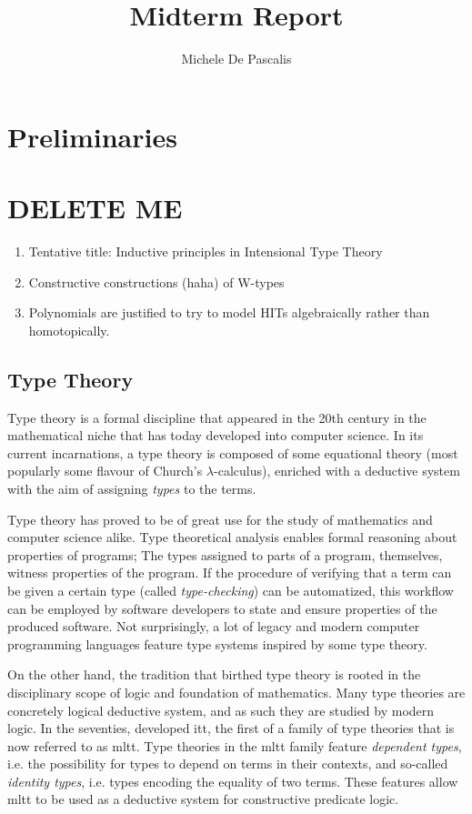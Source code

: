 \documentclass[a4paper]{article}
\author{Michele De Pascalis}
\title{Midterm Report}
\begin{document}
\maketitle

\section{Preliminaries}

\section{DELETE ME}

\begin{enumerate}

	\item Tentative title: Inductive principles in Intensional Type Theory
	\item Constructive constructions (haha) of W-types
	\item Polynomials are justified to try to model HITs algebraically rather than homotopically.
\end{enumerate}

\subsection{Type Theory}

Type theory is a formal discipline that appeared in the 20th century in the mathematical niche that has today developed into computer science. In its current incarnations, a type theory is composed of some equational theory (most popularly some flavour of Church's \(\lambda\)-calculus), enriched with a deductive system with the aim of assigning \textit{types} to the terms.

Type theory has proved to be of great use for the study of mathematics and computer science alike. Type theoretical analysis enables formal reasoning about properties of programs; The types assigned to parts of a program, themselves, witness properties of the program. If the procedure of verifying that a term can be given a certain type (called \textit{type-checking}) can be automatized, this workflow can be employed by software developers to state and ensure properties of the produced software. Not surprisingly, a lot of legacy and modern computer programming languages feature type systems inspired by some type theory.

On the other hand, the tradition that birthed type theory is rooted in the disciplinary scope of logic and foundation of mathematics. Many type theories are concretely logical deductive system, and as such they are studied by modern logic. In the seventies, \textcite{MartinLoef1998} developed \gls{itt}, the first of a family of type theories that is now referred to as \gls{mltt}. Type theories in the \gls{mltt} family feature \textit{dependent types}, i.e. the possibility for types to depend on terms in their contexts, and so-called \textit{identity types}, i.e. types encoding the equality of two terms. These features allow \gls{mltt} to be used as a deductive system for constructive predicate logic.
\end{document}
